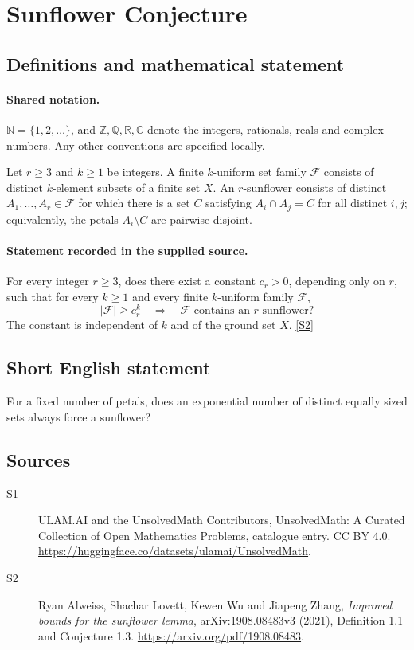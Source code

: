 \documentclass[11pt]{article}
\newcommand{\sref}[2]{\hyperlink{source:#1:#2}{[S#2]}}
\begin{document}
\section{Sunflower Conjecture}\label{statement}

\subsection{Definitions and mathematical statement}

\paragraph{Shared notation.}$\mathbb N=\{1,2,\ldots\}$, and $\mathbb Z,\mathbb Q,\mathbb R,\mathbb C$ denote the integers, rationals, reals and complex numbers. Any other conventions are specified locally.


Let $r\geq3$ and $k\geq1$ be integers. A finite $k$-uniform set family $\mathcal F$ consists of distinct $k$-element subsets of a finite set $X$. An $r$-sunflower consists of distinct $A_1,\ldots,A_r\in\mathcal F$ for which there is a set $C$ satisfying $A_i\cap A_j=C$ for all distinct $i,j$; equivalently, the petals $A_i\setminus C$ are pairwise disjoint.
\paragraph{Statement recorded in the supplied source.}
For every integer $r\geq3$, does there exist a constant $c_r>0$, depending only on $r$, such that for every $k\geq1$ and every finite $k$-uniform family $\mathcal F$,
\[
|\mathcal F|\geq c_r^k\quad\Longrightarrow\quad\mathcal F\text{ contains an }r\text{-sunflower}?
\]
The constant is independent of $k$ and of the ground set $X$. \sref{statement}{2}

\subsection{Short English statement}
For a fixed number of petals, does an exponential number of distinct equally sized sets always force a sunflower?
\subsection{Sources}
\begin{description}
\item[\hypertarget{source:statement:1}{S1}] ULAM.AI and the UnsolvedMath Contributors, UnsolvedMath: A Curated Collection of Open Mathematics Problems, catalogue entry. CC BY 4.0. \url{https://huggingface.co/datasets/ulamai/UnsolvedMath}.
\item[\hypertarget{source:statement:2}{S2}] Ryan Alweiss, Shachar Lovett, Kewen Wu and Jiapeng Zhang, \emph{Improved bounds for the sunflower lemma}, arXiv:1908.08483v3 (2021), Definition 1.1 and Conjecture 1.3. \url{https://arxiv.org/pdf/1908.08483}.
\end{description}
\label{end:statement}
\end{document}
